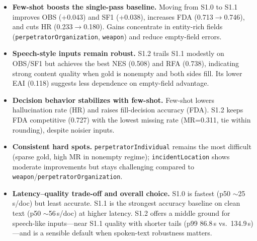 \begin{itemize}
    \item \textbf{Few-shot boosts the single-pass baseline.} Moving from S1.0 to S1.1 improves OBS (+0.043) and SF1 (+0.038), increases FDA (0.713$\rightarrow$0.746), and cuts HR (0.233$\rightarrow$0.180). Gains concentrate in entity-rich fields (\texttt{perpetratorOrganization}, \texttt{weapon}) and reduce empty-field errors.
    \item \textbf{Speech-style inputs remain robust.} S1.2 trails S1.1 modestly on OBS/SF1 but achieves the best NES (0.508) and RFA (0.738), indicating strong content quality when gold is nonempty and both sides fill. Its lower EAI (0.118) suggests less dependence on empty-field advantage.
    \item \textbf{Decision behavior stabilizes with few-shot.} Few-shot lowers hallucination rate (HR) and raises fill-decision accuracy (FDA). S1.2 keeps FDA competitive (0.727) with the lowest missing rate (MR{=}0.311, tie within rounding), despite noisier inputs.
    \item \textbf{Consistent hard spots.} \texttt{perpetratorIndividual} remains the most difficult (sparse gold, high MR in nonempty regime); \texttt{incidentLocation} shows moderate improvements but stays challenging compared to \texttt{weapon}/\texttt{perpetratorOrganization}.
    \item \textbf{Latency–quality trade-off and overall choice.} S1.0 is fastest (p50 $\sim$25\,s/doc) but least accurate. S1.1 is the strongest accuracy baseline on clean text (p50 $\sim$56\,s/doc) at higher latency. S1.2 offers a middle ground for speech-like inputs—near S1.1 quality with shorter tails (p99 86.8\,s vs.\ 134.9\,s)—and is a sensible default when spoken-text robustness matters.
\end{itemize}
